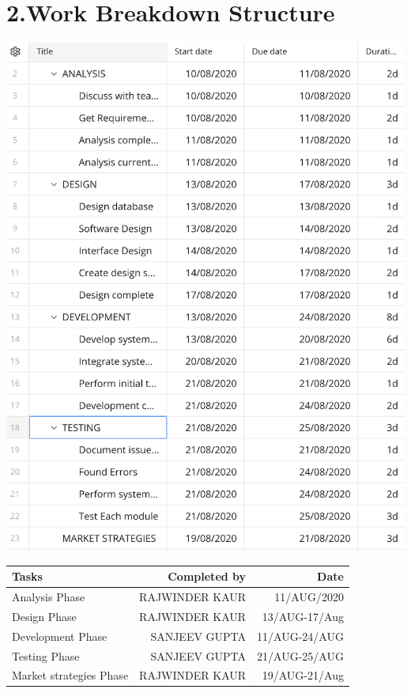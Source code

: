 \section * {\LARGE 2.Work Breakdown Structure}
\begin{center}
\includegraphics[scale=0.65]{FLOW.png}\\[0.75cm]
\end{center}



\begin{center}
\begin{tabular}{ l | r | r}

 Tasks & Completed by & Date  \\ 
 \hline \hline
 Analysis Phase & RAJWINDER KAUR & 11/AUG/2020  \\  
 Design Phase & RAJWINDER KAUR & 13/AUG-17/Aug  \\ 
 Development Phase & SANJEEV GUPTA & 11/AUG-24/AUG  \\
 Testing Phase & SANJEEV GUPTA & 21/AUG-25/AUG  \\ 
 Market strategies Phase & RAJWINDER KAUR & 19/AUG-21/Aug  \\ 
\end{tabular}
\end{center}

